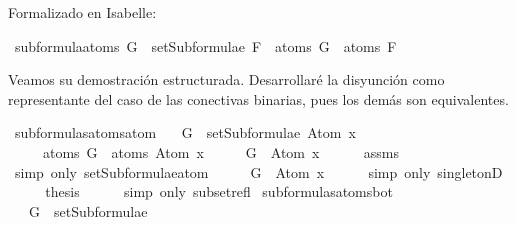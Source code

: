 \begin{isabellebody}
\begin{isamarkuptext}
  Formalizado en Isabelle:%
\end{isamarkuptext}\isamarkuptrue%
\isamarkupfalse%
\ subformula{\isacharunderscore}atoms{\isacharcolon}\ {\isachardoublequoteopen}G\ {\isasymin}\ setSubformulae\ F\ {\isasymLongrightarrow}\ atoms\ G\ {\isasymsubseteq}\ atoms\ F{\isachardoublequoteclose}\isanewline
%
\isadelimproof
\ \ %
\endisadelimproof
%
\isatagproof
{}\isamarkupfalse%
%
\endisatagproof
{\isafoldproof}%
%
\isadelimproof
%
\endisadelimproof
%
\begin{isamarkuptext}%
Veamos su demostración estructurada. Desarrollaré la disyunción como representante del caso
  de las conectivas binarias, pues los demás son equivalentes.%
\end{isamarkuptext}\isamarkuptrue%
\isamarkupfalse%
\ subformulas{\isacharunderscore}atoms{\isacharunderscore}atom{\isacharcolon}\isanewline
\ \ \ {\isachardoublequoteopen}G\ {\isasymin}\ setSubformulae\ {\isacharparenleft}Atom\ x{\isacharparenright}{\isachardoublequoteclose}\ \isanewline
\ \ \ \ \ {\isachardoublequoteopen}atoms\ G\ {\isasymsubseteq}\ atoms\ {\isacharparenleft}Atom\ x{\isacharparenright}{\isachardoublequoteclose}\isanewline
%
\isadelimproof
%
\endisadelimproof
%
\isatagproof
{}\isamarkupfalse%
\ {\isacharminus}\isanewline
\ \ \isamarkupfalse%
\ {\isachardoublequoteopen}G\ {\isasymin}\ {\isacharbraceleft}Atom\ x{\isacharbraceright}{\isachardoublequoteclose}\isanewline
\ \ \ \ \isamarkupfalse%
\ assms\isanewline
\ \ \ \ \isamarkupfalse%
\ {\isacharparenleft}simp\ only{\isacharcolon}\ setSubformulae{\isacharunderscore}atom{\isacharparenright}\isanewline
\ \ \isamarkupfalse%
\ \isamarkupfalse%
\ {\isachardoublequoteopen}G\ {\isacharequal}\ Atom\ x{\isachardoublequoteclose}\isanewline
\ \ \ \ \isamarkupfalse%
\ {\isacharparenleft}simp\ only{\isacharcolon}\ singletonD{\isacharparenright}\isanewline
\ \ \isamarkupfalse%
\ \isamarkupfalse%
\ {\isacharquery}thesis\isanewline
\ \ \ \ \isamarkupfalse%
\ {\isacharparenleft}simp\ only{\isacharcolon}\ subset{\isacharunderscore}refl{\isacharparenright}\isanewline
{}\isamarkupfalse%
%
\endisatagproof
{\isafoldproof}%
%
\isadelimproof
\isanewline
%
\endisadelimproof
\isanewline
{}\isamarkupfalse%
\ subformulas{\isacharunderscore}atoms{\isacharunderscore}bot{\isacharcolon}\isanewline
\ \ \ {\isachardoublequoteopen}G\ {\isasymin}\ setSubformulae\ {\isasymbottom}{\isachardoublequoteclose}\ \isanewline

\end{isabellebody}
